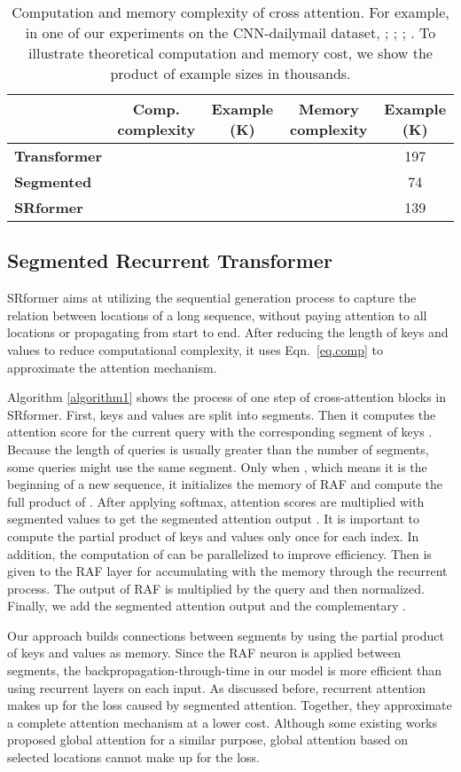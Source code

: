 \documentclass[11pt]{article}
\begin{document}
\begin{table*}
\begin{tabular}{l|cc|cc}
\hline
&   \textbf{Comp. complexity} & \textbf{Example (K)} & \textbf{Memory complexity}& \textbf{Example (K)}  \\
\hline
\textbf{Transformer}  &  &   &  & 197\\
\textbf{Segmented} & &  &  & 74\\
\textbf{SRformer} &  &  &  & 139\\
\hline
\end{tabular}
\caption{ Computation and memory complexity of cross attention. For example, in one of our experiments on the CNN-dailymail dataset, ; ; ; . To illustrate theoretical computation and memory cost, we show the product of example sizes in thousands.}
\label{complexity}
\end{table*}
\subsection{Segmented Recurrent Transformer}
SRformer aims at utilizing the sequential generation process to capture the relation between locations of a long sequence, without paying attention to all locations or propagating from start to end.
After reducing the length of keys and values to reduce computational complexity, it uses Eqn.~\ref{eq.comp} to approximate the attention mechanism.


Algorithm \ref{algorithm1} shows the process of one step of cross-attention blocks in SRformer. First, keys and values are split into segments. Then it computes the attention score  for the current query with the corresponding segment of keys . Because the length of queries is usually greater than the number of segments, some queries might use the same segment. Only when , which means it is the beginning of a new sequence, it initializes the memory of RAF and compute the full product of . After applying softmax, attention scores are multiplied with segmented values to get the segmented attention output . It is important to compute the partial product  of keys and values only once for each index. In addition, the computation of  can be parallelized to improve efficiency.  Then  is given to the RAF layer for accumulating with the memory through the recurrent process. The output of RAF is multiplied by the query and then normalized. Finally, we add the segmented attention output  and the complementary .

Our approach builds connections between segments by using the partial product of keys and values as memory. Since the RAF neuron is applied between segments, the backpropagation-through-time in our model is more efficient than using recurrent layers on each input. As discussed before, recurrent attention makes up for the loss caused by segmented attention. Together, they approximate a complete attention mechanism at a lower cost. Although some existing works proposed global attention for a similar purpose, global attention based on selected locations cannot make up for the loss. 
\end{document}
